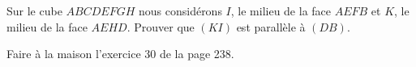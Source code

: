 
\begin{exercice}\label{exosmath-0525}

    Sur le cube \( ABCDEFGH\) nous considérons \( I\), le milieu de la face \( AEFB\) et \( K\), le milieu de la face \( AEHD\). Prouver que \( (KI)\) est parallèle à \( (DB)\).

    Faire à la maison l'exercice 30 de la page 238.

\end{exercice}

